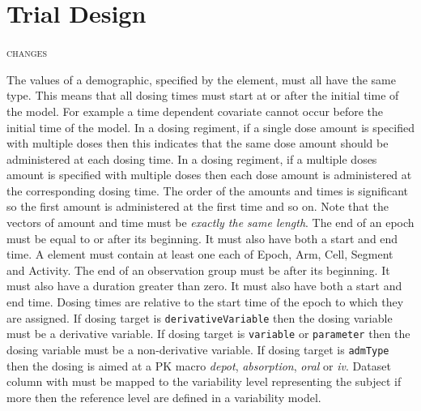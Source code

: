 \section{Trial Design}
{\color{red} \scshape{changes}}

\begin{valrules}
 The values of a demographic,
specified by the  element, must all have the same
type.
 This
means that all dosing times must start at or after the initial time of
the model.
 For example a time dependent covariate cannot occur
before the initial time of the model.
 In a
dosing regiment, if a single dose amount is specified with multiple
doses then this indicates that the same dose amount should be
administered at each dosing time.
 In a
dosing regiment, if a multiple doses amount is specified with multiple
doses then each dose amount is administered at the corresponding
dosing time. The order of the amounts and times is significant so the
first amount is administered at the first time and so on. Note that
the vectors of amount and time must be \emph{exactly the same length}.
 The end of an epoch
must be equal to or after its beginning. It must also have both a start and end time.
 A 
element must contain at least one each of Epoch, Arm, Cell, Segment
and Activity.
 The end
of an observation group must be after its beginning. It must also have
a duration greater than zero. It must also have both a start and end
time.
 Dosing times are
relative to the start time of the epoch to which they are assigned.
 If dosing target is 
\texttt{derivativeVariable} then the dosing variable must be a
derivative variable.
 If dosing target is 
\texttt{variable} or \texttt{parameter} then the dosing variable must be a
non-derivative variable.
 If dosing target is \texttt{admType} 
then the dosing is aimed at a PK macro \emph{depot}, \emph{absorption}, 
\emph{oral} or \emph{iv}.
 Dataset column 
with  must be mapped to the variability level representing
the subject if more then the reference level are defined in a variability model.
%
\end{valrules}


